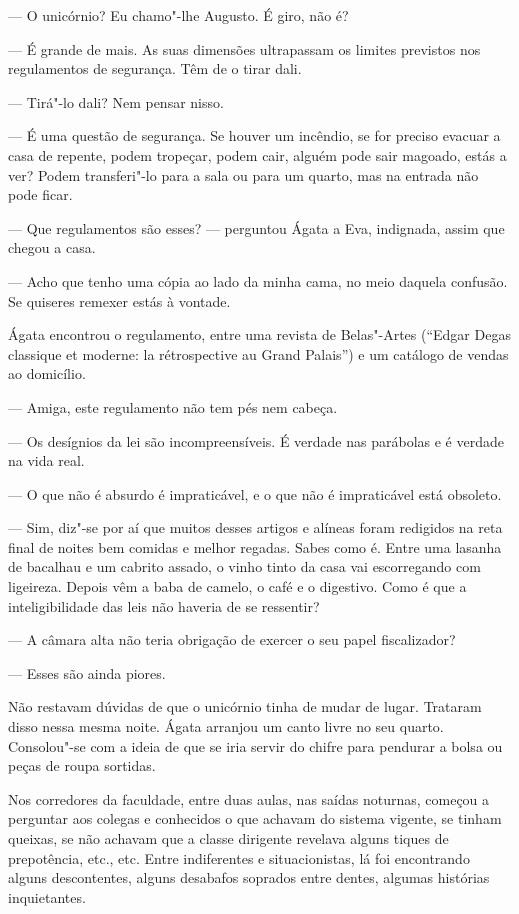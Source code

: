 --- O unicórnio? Eu chamo"-lhe Augusto. É giro, não é?

--- É grande de mais. As suas dimensões ultrapassam os limites previstos
  nos regulamentos de segurança. Têm de o tirar dali.

--- Tirá"-lo dali? Nem pensar nisso.

--- É uma questão de segurança. Se houver um incêndio, se for preciso
  evacuar a casa de repente, podem tropeçar, podem cair, alguém pode
  sair magoado, estás a ver? Podem transferi"-lo para a sala ou para um
  quarto, mas na entrada não pode ficar.

--- Que regulamentos são esses? --- perguntou Ágata a Eva, indignada,
  assim que chegou a casa.

--- Acho que tenho uma cópia ao lado da minha cama, no meio daquela
  confusão. Se quiseres remexer estás à vontade.

Ágata encontrou o regulamento, entre uma revista de Belas"-Artes
(``Edgar Degas classique et moderne: la rétrospective au Grand Palais'')
e um catálogo de vendas ao domicílio.

--- Amiga, este regulamento não tem pés nem cabeça.

--- Os desígnios da lei são incompreensíveis. É verdade nas parábolas e é
  verdade na vida real.

--- O que não é absurdo é impraticável, e o que não é impraticável está
  obsoleto.

--- Sim, diz"-se por aí que muitos desses artigos e alíneas foram redigidos
  na reta final de noites bem comidas e melhor regadas. Sabes como é.
  Entre uma lasanha de bacalhau e um cabrito assado, o vinho tinto da
  casa vai escorregando com ligeireza. Depois vêm a baba de camelo, o
  café e o digestivo. Como é que a inteligibilidade das leis não haveria
  de se ressentir?

--- A câmara alta não teria obrigação de exercer o seu papel
  fiscalizador?

--- Esses são ainda piores.

Não restavam dúvidas de que o unicórnio tinha de mudar de lugar.
Trataram disso nessa mesma noite. Ágata arranjou um canto livre no seu
quarto. Consolou"-se com a ideia de que se iria servir do chifre para
pendurar a bolsa ou peças de roupa sortidas.

Nos corredores da faculdade, entre duas aulas, nas saídas noturnas,
começou a perguntar aos colegas e conhecidos o que achavam do sistema
vigente, se tinham queixas, se não achavam que a classe dirigente
revelava alguns tiques de prepotência, etc., etc. Entre indiferentes e
situacionistas, lá foi encontrando alguns descontentes, alguns desabafos
soprados entre dentes, algumas histórias inquietantes.


